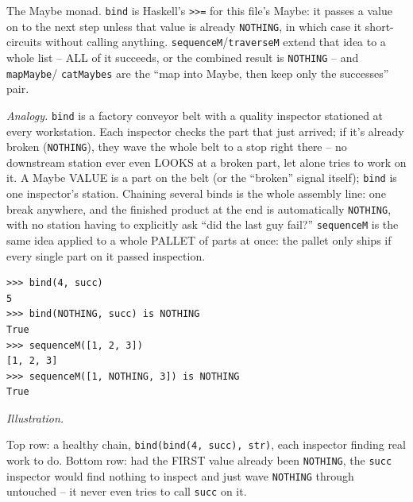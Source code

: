 \documentclass[10pt,letterpaper]{book}
\begin{document}
The Maybe monad. \texttt{bind} is Haskell's \texttt{>>=} for this file's Maybe: it passes a value on
to the next step unless that value is already \texttt{NOTHING}, in which case it short-circuits
without calling anything. \texttt{sequenceM}/\texttt{traverseM} extend that idea to a whole list --
ALL of it succeeds, or the combined result is \texttt{NOTHING} -- and \texttt{mapMaybe}/
\texttt{catMaybes} are the ``map into Maybe, then keep only the successes'' pair.

\textit{Analogy.} \texttt{bind} is a factory conveyor belt with a quality inspector stationed at
every workstation. Each inspector checks the part that just arrived; if it's already broken
(\texttt{NOTHING}), they wave the whole belt to a stop right there -- no downstream station ever
even LOOKS at a broken part, let alone tries to work on it. A Maybe VALUE is a part on the belt
(or the ``broken'' signal itself); \texttt{bind} is one inspector's station. Chaining several binds
is the whole assembly line: one break anywhere, and the finished product at the end is
automatically \texttt{NOTHING}, with no station having to explicitly ask ``did the last guy fail?''
\texttt{sequenceM} is the same idea applied to a whole PALLET of parts at once: the pallet only ships
if every single part on it passed inspection.
\begin{lstlisting}[style=ex]
>>> bind(4, succ)
5
>>> bind(NOTHING, succ) is NOTHING
True
>>> sequenceM([1, 2, 3])
[1, 2, 3]
>>> sequenceM([1, NOTHING, 3]) is NOTHING
True
\end{lstlisting}
\noindent\textit{Illustration.}
\begin{center}
\end{center}
Top row: a healthy chain, \texttt{bind(bind(4, succ), str)}, each inspector finding real work to do.
Bottom row: had the FIRST value already been \texttt{NOTHING}, the \texttt{succ} inspector would
find nothing to inspect and just wave \texttt{NOTHING} through untouched -- it never even tries to
call \texttt{succ} on it.
\end{document}
